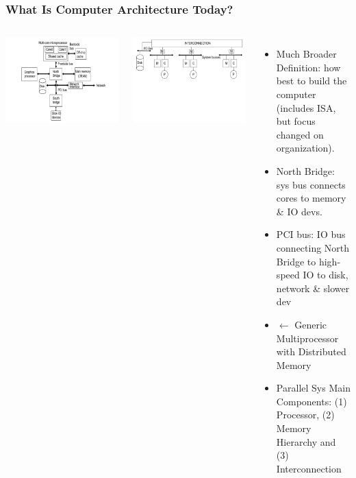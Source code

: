 \documentclass{beamer}
\newcommand{\emp}[1]{\textcolor{DikuRed}{ #1}}
\begin{document}
\begin{frame}[fragile,t]
\frametitle{What Is Computer Architecture Today?}

\begin{columns}
\hspace{-6ex}\includegraphics[width=44ex]{Ch1Figs/SimpleCPU}

\includegraphics[width=39ex]{Ch1Figs/SimpleInterconnect}
\vspace{-17ex}
\begin{itemize}
    \item \emp{Much Broader Definition}: how best to build the computer 
            (includes ISA, but focus changed on organization).\medskip

    \item North Bridge: sys bus connects cores to memory \& IO devs.
    \item PCI bus: IO bus connecting North Bridge to high-speed IO 
            to disk, network \& slower dev\medskip

    \item $\leftarrow$ Generic Multiprocessor with Distributed Memory\medskip

    \item \alert{Parallel Sys Main Components:
                (1) Processor, (2) Memory Hierarchy and 
                (3) Interconnection}
\end{itemize}
\end{columns}

\end{frame}
\end{document}
